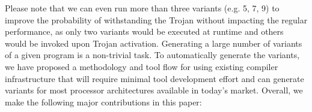 \documentclass[conference]{IEEEtran}
\begin{document}
Please note that we can even run more than three variants (e.g. 5, 7, 9) to improve the probability of withstanding the Trojan without impacting the regular performance, as only two variants would be executed at runtime and others would be invoked upon Trojan activation. 
Generating a large number of variants of a given program is a non-trivial task. To automatically  generate the variants, we have proposed a methodology and tool flow for using existing compiler infrastructure that will require minimal tool development effort and can  generate variants for most processor architectures available in today's market. %
Overall, we make the following major contributions in this paper:
\end{document}
